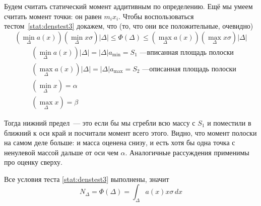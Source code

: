 \documentclass[12pt]{../../notes}
\begin{document}
\begin{exmp}
  Будем считать статический момент аддитивным по определению. Ещё мы умеем считать момент точки: он равен $m_i x_i$.
  Чтобы воспользоваться тестом~\ref{stat:denstest3} докажем, что (то, что они все положительные, очевидно)
  \[ 
    \left( \min_{\Delta} a \left( x \right) \right)  \left( \min_{\Delta} x
    \sigma \right)  \left| \Delta \right| \leqslant \Phi \left( \Delta
    \right) \leqslant \left( \max_{\Delta} a \left( x \right) \right)  \left(
    \max_{\Delta} x \sigma \right) \left| \Delta \right| 
   \]
  \begin{align*}
    & \left( \min_{\Delta} a \left( x \right) \right)  \left| \Delta
    \right| = \left| \Delta \right| a_{\min} = S_1 \text{~---вписанная площадь полоски}\\
    & \left( \max_{\Delta} a \left( x \right) \right)  \left| \Delta
    \right| = \left| \Delta \right| a_{\max} = S_2 \text{~---описанная площадь полоски}\\
    & \left( \min_{\Delta} x \right) = \alpha \\
    & \left(\max_{\Delta} x \right) = \beta 
  \end{align*}
  
  Тогда нижний предел~--- это если бы мы
  сгребли всю массу с $S_1$ и поместили в
  ближний к оси край и посчитали момент
  всего этого. Видно, что момент полоски на
  самом деле больше: и масса оценена снизу,
  и есть хотя бы одна точка с ненулевой
  массой дальше от оси чем $\alpha$.
  Аналогичные рассуждения применимы про
  оценку сверху.
  
  Все условия теста \ref{stat:denstest3} выполнены,
  значит
  \[ 
    N_{\Delta} = \Phi \left( \Delta \right) = \int_{\Delta} a(x) x \sigma \, d  x 
   \]
\end{exmp}
\end{document}
